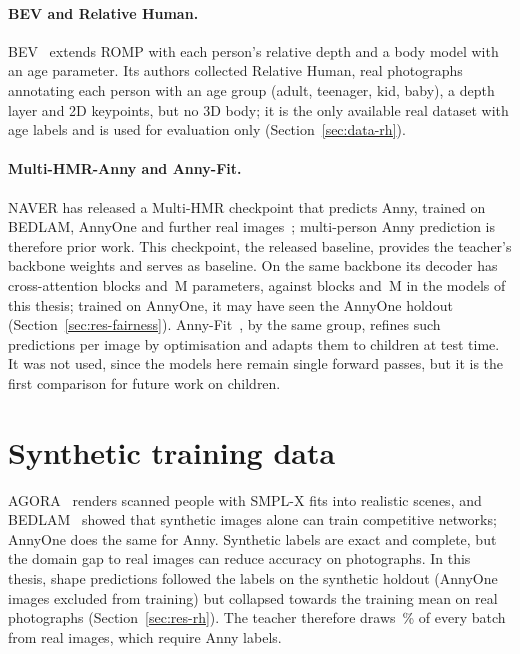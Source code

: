 \paragraph{BEV and Relative Human.}
BEV~\cite{sun2022bev} extends ROMP with each person's relative depth and a body model with an age parameter. Its
authors collected Relative Human, real photographs annotating each person with an age group (adult, teenager, kid,
baby), a depth layer and 2D keypoints, but no 3D body; it is the only available real dataset with age labels and is
used for evaluation only (Section~\ref{sec:data-rh}).

\paragraph{Multi-HMR-Anny and Anny-Fit.}
NAVER has released a Multi-HMR checkpoint that predicts Anny, trained on BEDLAM, AnnyOne and further real
images~\cite{naver2024multihmrcode}; multi-person Anny prediction is therefore prior work. This checkpoint, the released baseline, provides the teacher's backbone weights
and serves as baseline. On the same backbone its decoder has \BgNaverHeadLayers{} cross-attention blocks
and \BgNaverHeadParams\,M parameters, against \BgOurHeadLayers{} blocks and \BgOurHeadParams\,M in the models of this
thesis; trained on AnnyOne, it may have seen the AnnyOne holdout (Section~\ref{sec:res-fairness}).
Anny-Fit~\cite{bravo2026annyfit}, by the same group, refines such predictions per image by optimisation and adapts them
to children at test time. It was not used, since the models here remain single forward passes, but it is the first
comparison for future work on children.

\section{Synthetic training data}
\label{sec:bg-synthetic}

AGORA~\cite{patel2021agora} renders scanned people with SMPL-X fits into realistic scenes, and
BEDLAM~\cite{black2023bedlam} showed that synthetic images alone can train competitive networks; AnnyOne does the same
for Anny. Synthetic labels are exact and complete, but the domain gap to real images can reduce accuracy on
photographs. In this thesis, shape predictions followed the labels on the synthetic holdout (AnnyOne images excluded
from training) but collapsed towards the training mean on real photographs (Section~\ref{sec:res-rh}). The teacher
therefore draws \BgMixReal\,\% of every batch from real images, which require Anny labels.

